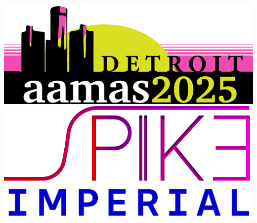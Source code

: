 \documentclass{tikzposter} %
\begin{document}
\begin{columns}
{        \begin{center}
            \includegraphics[scale=1]{img/aamas2025logo.png}
            \includegraphics[scale=0.4]{img/spike_logo.png}
            \includegraphics[width=0.1\columnwidth]{img/imperial_blue.png}
        \end{center}
    }



\end{columns}
\end{document}
